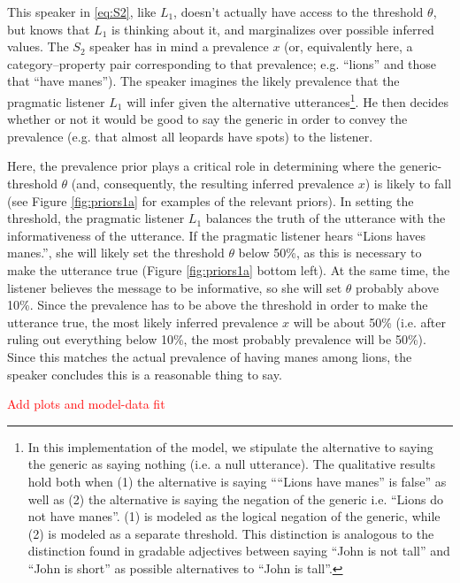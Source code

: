 \documentclass[10pt,letterpaper]{article}
\newcommand{\red}[1]{\textcolor{Red}{#1}}
\begin{document}
This speaker in \eqref{eq:S2}, like $L_{1}$, doesn't actually have access to the threshold $\theta$, but knows that $L_{1}$ is thinking about it, and marginalizes over possible inferred values. The $S_{2}$ speaker has in mind a prevalence $x$ (or, equivalently here, a category--property pair corresponding to that prevalence; e.g. ``lions'' and those that ``have manes''). The speaker imagines the likely prevalence that the pragmatic listener $L_{1}$ will infer given the alternative utterances\footnote{In this implementation of the model, we stipulate the alternative to saying the generic as saying nothing (i.e. a null utterance). The qualitative results hold both when (1) the alternative is saying ````Lions have manes'' is false'' as well as (2) the alternative is saying the negation of the generic i.e. ``Lions do not have manes''. (1) is modeled as the logical negation of the generic, while (2) is modeled as a separate threshold. This distinction is analogous to the distinction found in gradable adjectives between saying ``John is not tall'' and ``John is short'' as possible alternatives to ``John is tall''.}. He then decides whether or not it would be good to say the generic in order to convey the prevalence (e.g. that almost all leopards have spots) to the listener.

Here, the prevalence prior plays a critical role in determining where the generic-threshold $\theta$ (and, consequently, the resulting inferred prevalence $x$) is likely to fall (see Figure \ref{fig:priors1a} for examples of the relevant priors). In setting the threshold, the pragmatic listener $L_{1}$ balances the truth of the utterance with the informativeness of the utterance. If the pragmatic listener hears ``Lions haves manes.'', she will likely set the threshold $\theta$ below 50\%, as this is necessary to make the utterance true (Figure \ref{fig:priors1a} bottom left). At the same time, the listener believes the message to be informative, so she will set $\theta$ probably above 10\%. Since the prevalence has to be above the threshold in order to make the utterance true, the most likely inferred prevalence $x$ will be about 50\% (i.e. after ruling out everything below 10\%, the most probably prevalence will be 50\%). Since this matches the actual prevalence of having manes among lions, the speaker concludes this is a reasonable thing to say.


\red{Add plots and model-data fit}
\end{document}
